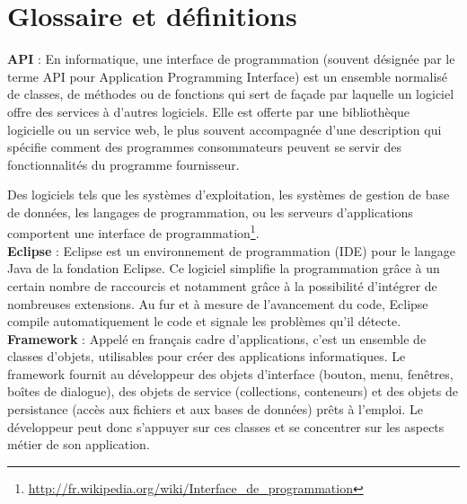 \documentclass[12pt,openany]{StyleBertrand}
\author{Bertrand Guerrero}
\begin{document}
\chapter{Glossaire et définitions}
\label{Glossaire}

\textbf{API} : En informatique, une interface de programmation (souvent désignée par le terme API pour Application Programming Interface) est un ensemble normalisé de classes, de méthodes ou de fonctions qui sert de façade par laquelle un logiciel offre des services à d'autres logiciels. Elle est offerte par une bibliothèque logicielle ou un service web, le plus souvent accompagnée d'une description qui spécifie comment des programmes consommateurs peuvent se servir des fonctionnalités du programme fournisseur.

Des logiciels tels que les systèmes d'exploitation, les systèmes de gestion de base de données, les langages de programmation, ou les serveurs d'applications comportent une interface de programmation\footnote{\url{http://fr.wikipedia.org/wiki/Interface_de_programmation}}.\\

\textbf{Eclipse} :  Eclipse est un environnement de programmation (IDE) pour le langage Java de la fondation Eclipse. Ce logiciel simplifie la programmation grâce à un certain nombre de raccourcis et notamment grâce à la possibilité d'intégrer de nombreuses extensions. Au fur et à mesure de l'avancement du code, Eclipse compile automatiquement le code et signale les problèmes qu'il détecte.\\

\textbf{Framework} : Appelé en français cadre d'applications, c'est un ensemble de classes d'objets, utilisables pour créer des applications informatiques. Le framework fournit au développeur des objets d'interface (bouton, menu, fenêtres, boîtes de dialogue), des objets de service (collections, conteneurs) et des objets de persistance (accès aux fichiers et aux bases de données) prêts à l'emploi. Le développeur peut donc s'appuyer sur ces classes et se concentrer sur les aspects métier de son application.\\

\pagebreak
\end{document}
